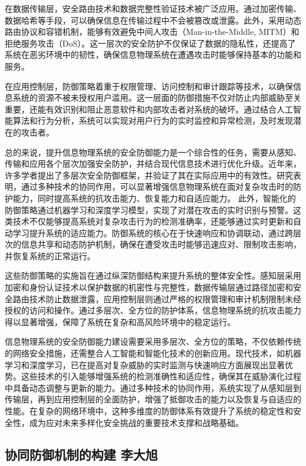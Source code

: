 在数据传输层，安全路由技术和数据完整性验证技术被广泛应用。通过加密传输、数据哈希等手段，可以确保信息在传输过程中不会被篡改或泄露。此外，采用动态路由协议和容错机制，能够有效避免中间人攻击（Man-in-the-Middle, MITM）和拒绝服务攻击（DoS）。这一层次的安全防护不仅保证了数据的隐私性，还提高了系统在恶劣环境中的韧性，确保信息物理系统在遭遇攻击时能够保持基本的功能和服务。

在应用控制层，防御策略着重于权限管理、访问控制和审计跟踪等技术，以确保信息系统的资源不被未授权用户滥用。这一层面的防御措施不仅对防止内部威胁至关重要，还能有效识别和阻止恶意软件和内部攻击者对系统的破坏。通过结合人工智能算法和行为分析，系统可以实现对用户行为的实时监控和异常检测，及时发现潜在的攻击者。

总的来说，提升信息物理系统的安全防御能力是一个综合性的任务，需要从感知、传输和应用各个层次加强安全防护，并结合现代信息技术进行优化升级。近年来，许多学者提出了多层次安全防御框架，并验证了其在实际应用中的有效性。研究表明，通过多种技术的协同作用，可以显著增强信息物理系统在面对复杂攻击时的防护能力，同时提高系统的抗攻击能力、恢复能力和自适应能力。
此外，智能化的防御策略通过机器学习和深度学习模型，实现了对潜在攻击的实时识别与预警。这类技术不仅能够提高系统对复杂攻击行为的检测准确率，还能够通过实时更新和自动学习提升系统的适应能力。防御系统的核心在于快速响应和协调联动，通过跨层次的信息共享和动态防护机制，确保在遭受攻击时能够迅速应对、限制攻击影响，并恢复系统的正常运行。

这些防御策略的实施旨在通过纵深防御结构来提升系统的整体安全性。感知层采用加密和身份认证技术以保护数据的机密性与完整性，数据传输层通过路径加密和安全路由技术防止数据泄露，应用控制层则通过严格的权限管理和审计机制限制未经授权的访问和操作。通过多层次、全方位的防护体系，信息物理系统的抗攻击能力得以显著增强，保障了系统在复杂和高风险环境中的稳定运行。

信息物理系统的安全防御能力建设需要采用多层次、全方位的策略，不仅依赖传统的网络安全措施，还需整合人工智能和智能化技术的创新应用。现代技术，如机器学习和深度学习，已在提高对复杂威胁的实时监测与快速响应方面展现出显著优势。这些技术的引入能够增强系统的检测准确性和适应性，确保其在威胁演化过程中具备动态调整与更新的能力。通过多种技术的协同作用，系统实现了从感知层到传输层，再到应用控制层的全面防护，增强了抵御攻击的能力以及恢复与自适应的性能。在复杂的网络环境中，这种多维度的防御体系有效提升了系统的稳定性和安全性，成为应对未来多样化安全挑战的重要技术支撑和战略基础。

\subsection{协同防御机制的构建 李大旭}

